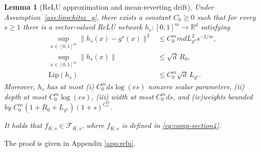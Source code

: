 \documentclass{article}
\newtheorem{lem}[thm]{Lemma}
\newcommand{\1}{\mathbbm{1}}
\numberwithin{equation}{section}
\def\to{\rightarrow}
\def\cX{\mathcal{X}}
\begin{document}

\begin{lem}[ReLU approximation and mean-reverting drift]
\label{lem:relu-selector-approx}
Under Assumption~\ref{ass:lipschitsz_g},  there exists a constant $C_0\ge 0$ such that for every \(s\ge1\) there is a vector-valued ReLU network \(h_s:[0,1]^m\to\mathbb R^d\) satisfying 
\begin{align}
 \sup_{x\in[0,1]^m}\|h_s(x)-g^\star(x)\|^2&\le C_0^m m d L_{g^\star}^2s^{-2/m},\label{eq:h-error-section4}\\
 \sup_{x\in[0,1]^m}\|h_s(x)\| &\le \sqrt{d}\,R_0,\label{eq:h-bound-section4}\\
 \mathrm{Lip}(h_s)&\le C_0^m\sqrt d\,L_{g^\star}.
\label{eq:h-lip-section4}
\end{align}
Moreover, 
$h_s$ has
at most (i) \(C_0^m d s\log(e s)\) nonzero scalar parameters, (ii) depth at most \(C_0^m\log(e s)\), (iii) width at most \(C_0^mds\), and (iv)weights bounded by $ C_0^m(1+R_0+L_{g^\star})(1+s)^{C_0^m}$.

It holds that $ f_{K,s}\in\mathcal F_{K,s} $, 
where $f_{K,s}$ is defined in \eqref{eq:comp-section4}.
\end{lem}


The proof is given in Appendix \ref{app:relu}.
\end{document}
